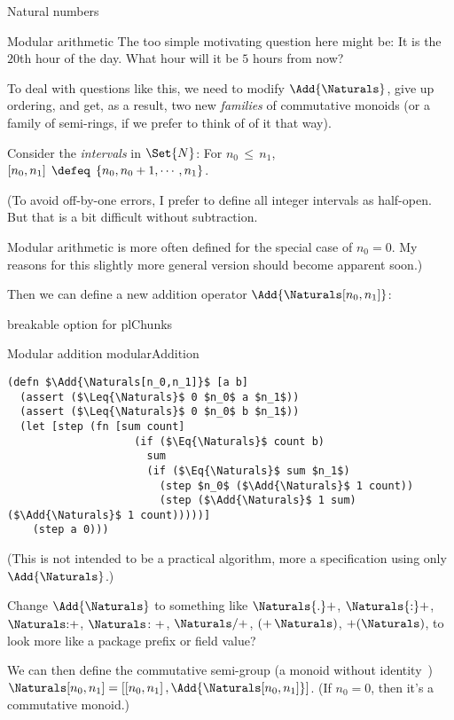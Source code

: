 \documentclass[12pt]{PalisadesLakesBook}
\begin{document}
\begin{plSection}{Natural numbers}
\begin{plSection}{Modular arithmetic}
The too simple motivating question here might be:
It is the $20$th hour of the day. What hour will it be $5$ hours
from now?

To deal with questions like this, we need to modify 
$\Add{\Naturals}$,
give up ordering, and get, as a result, two new \emph{families} of 
commutative monoids (or a family of semi-rings, 
if we prefer to think of of it that way).

Consider the \emph{intervals} in $\Set{N}$:
For $n_{0}\,\leq\, n_{1}$, 
$\left[ n_{0}, n_{1} \right] \; \defeq \;
\left\{ n_{0}, n_{0} + 1, \cdots , n_{1} \right\}$.

(\NOTE To avoid off-by-one errors, 
I prefer to define all integer intervals as half-open.
But that is a bit difficult without subtraction.

\NOTE Modular arithmetic is more often defined for the special 
case of $n_0=0$. My reasons for this slightly more general 
version should become apparent soon.)

Then we can define a new addition operator 
$\Add{ \Naturals[n_0,n_1] }$:

\TODO breakable option for plChunks

\begin{plAlgorithm}
[breakable=false]
{Modular addition}
{modularAddition}
\begin{lstlisting}[language=pseudocode]
(defn $\Add{\Naturals[n_0,n_1]}$ [a b]
  (assert ($\Leq{\Naturals}$ 0 $n_0$ a $n_1$))
  (assert ($\Leq{\Naturals}$ 0 $n_0$ b $n_1$))
  (let [step (fn [sum count]
                    (if ($\Eq{\Naturals}$ count b)
                      sum
                      (if ($\Eq{\Naturals}$ sum $n_1$)
                        (step $n_0$ ($\Add{\Naturals}$ 1 count))
                        (step ($\Add{\Naturals}$ 1 sum) ($\Add{\Naturals}$ 1 count)))))]
    (step a 0)))
\end{lstlisting}
\end{plAlgorithm}
(\NOTE This is not intended to be a practical algorithm,
more a specification using only $\Add{\Naturals}$.)

\TODO Change $\Add{\Naturals}$ to something like
$\mathsf{\Naturals{.}+}$, 
$\mathsf{\Naturals{:}+}$, 
$\Naturals\mathsf{{:}+}$, 
$\Naturals\mathsf{{\colon}+}$, 
$\Naturals\mathsf{/+}$, 
$\mathsf{(+ \, \Naturals)}$, 
$\mathsf{+(\Naturals)}$, 
to look more like a package prefix or field value?

We can then define the commutative semi-group 
(a monoid without identity~\cite{wiki:Semigroup})
$
\Naturals[n_0,n_1] =
\left[ 
\left[ n_{0}, n_{1} \right], 
\Add{\Naturals[n_0,n_1]}
\right]
$.
(If $n_0=0$, then it's a commutative monoid.)


\end{plSection}
\end{plSection}
\end{document}
